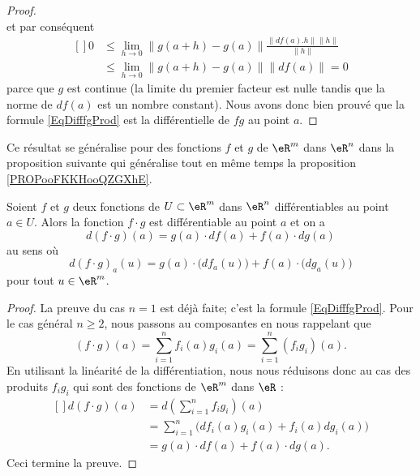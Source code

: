 \begin{proof}
\begin{equation}
	\end{equation}
	et par conséquent
	\begin{equation}
		\begin{aligned}[]
			0 & \leq\lim_{h\to 0} \| g(a+h)-g(a) \|\frac{ \| df(a).h \|\| h \| }{ \| h \| } \\
			  & \leq \lim_{h\to 0} \| g(a+h)-g(a) \|\| df(a) \|=0
		\end{aligned}
	\end{equation}
	parce que $g$ est continue (la limite du premier facteur est nulle tandis que la norme de $df(a)$ est un nombre constant). Nous avons donc bien prouvé que la formule \eqref{EqDifffgProd} est la différentielle de $fg$ au point $a$.
\end{proof}


Ce résultat se généralise pour des fonctions $f$ et $g$ de $\eR^m$ dans $\eR^n$ dans la proposition suivante qui généralise tout en même temps la proposition \ref{PROPooFKKHooQZGXhE}.
\begin{proposition}
	Soient $f$ et $g$ deux fonctions de $U\subset\eR^m$ dans $\eR^n$ différentiables au point $a\in U$. Alors la fonction $f\cdot g$ est différentiable  au point $a$ et on a
	\begin{equation}
		d(f\cdot g)(a)=g(a)\cdot df(a)+f(a)\cdot dg(a)
	\end{equation}
	au sens où
	\begin{equation}		\label{Eqdfcdotgexpl}
		d(f\cdot g)_a(u)=g(a)\cdot\big( df_a(u) \big)+f(a)\cdot\big( dg_a(u) \big)
	\end{equation}
	pour tout $u\in\eR^m$.
\end{proposition}

\begin{proof}
	La preuve du cas $n=1$ est déjà faite; c'est la formule \eqref{EqDifffgProd}. Pour le cas général $n\geq 2$, nous passons au composantes en nous rappelant que
	\begin{equation}
		(f\cdot g)(a)=\sum_{i=1}^nf_i(a)g_i(a)=\sum_{i=1}^n(f_ig_i)(a).
	\end{equation}
	En utilisant la linéarité de la différentiation, nous nous réduisons donc au cas des produits $f_ig_i$ qui sont des fonctions de $\eR^m$ dans $\eR$ :
	\begin{equation}
		\begin{aligned}[]
			d(f\cdot g)(a) & =d\left( \sum_{i=1}^n f_ig_i \right)(a)              \\
			               & =\sum_{i=1}^n\big( df_i(a)g_i(a)+f_i(a)dg_i(a) \big) \\
			               & =g(a)\cdot df(a)+f(a)\cdot dg(a).
		\end{aligned}
	\end{equation}
	Ceci termine la preuve.
\end{proof}

